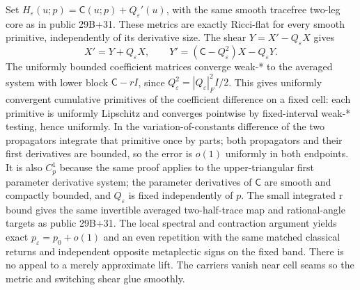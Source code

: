 \documentclass[11pt]{article}
\begin{document}
Set \(H_\varepsilon(u;p)=\mathsf C(u;p)+Q_\varepsilon'(u)\), with the same smooth tracefree two-leg core as in public 29B+31. These metrics are exactly Ricci-flat for every smooth primitive, independently of its derivative size. The shear \(Y=X'-Q_\varepsilon X\) gives
\[
X'=Y+Q_\varepsilon X,\qquad
Y'=(\mathsf C-Q_\varepsilon^2)X-Q_\varepsilon Y.
\]
The uniformly bounded coefficient matrices converge weak-* to the averaged system with lower block \(\mathsf C-rI\), since \(Q_\varepsilon^2=|Q_\varepsilon|_F^2 I/2\). This gives uniformly convergent cumulative primitives of the coefficient difference on a fixed cell: each primitive is uniformly Lipschitz and converges pointwise by fixed-interval weak-* testing, hence uniformly. In the variation-of-constants difference of the two propagators integrate that primitive once by parts; both propagators and their first derivatives are bounded, so the error is \(o(1)\) uniformly in both endpoints. It is also \(C^1_p\) because the same proof applies to the upper-triangular first parameter derivative system; the parameter derivatives of \(\mathsf C\) are smooth and compactly bounded, and \(Q_\varepsilon\) is fixed independently of \(p\). The small integrated r bound gives the same invertible averaged two-half-trace map and rational-angle targets as public 29B+31. The local spectral and contraction argument yields exact \(p_\varepsilon=p_0+o(1)\) and an even repetition with the same matched classical returns and independent opposite metaplectic signs on the fixed band. There is no appeal to a merely approximate lift. The carriers vanish near cell seams so the metric and switching shear glue smoothly.
\end{document}
